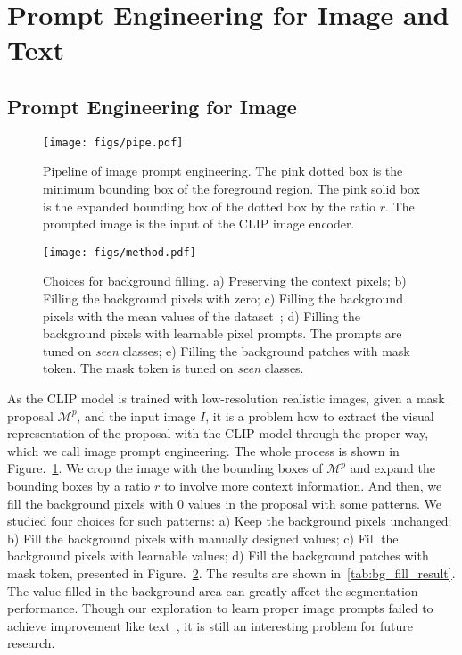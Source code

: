 \documentclass[runningheads]{llncs}
\begin{document}
\section{Prompt Engineering for Image and Text}
\subsection{Prompt Engineering for Image}

\begin{figure}[t]
  \centering
  \texttt{[image: figs/pipe.pdf]}
  \caption{Pipeline of image prompt engineering. The pink dotted box is the minimum bounding box of the foreground region. The pink solid box is the expanded bounding box of the dotted box by the ratio $r$. The prompted image is the input of the CLIP image encoder.}
   \label{fig:pipe}
\end{figure}
\begin{figure}[t]
  \centering
  \texttt{[image: figs/method.pdf]}
  \caption{Choices for background filling. a) Preserving the context pixels; b) Filling the background pixels with zero; c) Filling the background pixels with the mean values of the dataset~\cite{radford2021learning}; d) Filling the background pixels with learnable pixel prompts. The prompts are tuned on \emph{seen} classes; e) Filling the background patches with mask token. The mask token is tuned on \emph{seen} classes.}
   \label{fig:bgfill}
\end{figure}

As the CLIP model is trained with low-resolution realistic images, given a mask proposal $\mathcal{M}^p$, and the input image $I$, it is a problem how to extract the visual representation of the proposal with the CLIP model through the proper way, which we call image prompt engineering. The whole process is shown in Figure.~\ref{fig:pipe}. We crop the image with the bounding boxes of $\mathcal{M}^p$ and expand the bounding boxes by a ratio $r$ to involve more context information. And then, we fill the background pixels with $0$ values in the proposal with some patterns. We studied four choices for such patterns: a) Keep the background pixels unchanged; b) Fill the background pixels with manually designed values; c) Fill the background pixels with learnable values; d) Fill the background patches with mask token, presented in Figure.~\ref{fig:bgfill}. The results are shown in~\cref{tab:bg_fill_result}. The value filled in the background area can greatly affect the segmentation performance. 
Though our exploration to learn proper image prompts failed to achieve improvement like text~\cite{liu2021pre,zhou2021learning}, it is still an interesting problem for future research.
\end{document}
